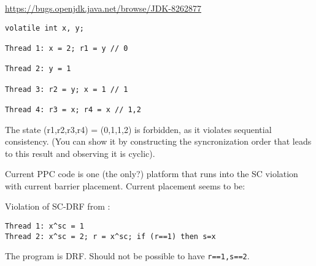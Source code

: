 
\url{https://bugs.openjdk.java.net/browse/JDK-8262877}
\begin{verbatim}
volatile int x, y;

Thread 1: x = 2; r1 = y // 0

Thread 2: y = 1

Thread 3: r2 = y; x = 1 // 1

Thread 4: r3 = x; r4 = x // 1,2
\end{verbatim}
The state (r1,r2,r3,r4) = (0,1,1,2) is forbidden, as it violates sequential
consistency. (You can show it by constructing the syncronization order that
leads to this result and observing it is cyclic).

Current PPC code is one (the only?) platform that runs into the SC violation
with current barrier placement. Current placement seems to be:

Violation of SC-DRF from \cite[Fig.~9]{DBLP:conf/pldi/WattPPBDFPG20}:
\begin{verbatim}
Thread 1: x^sc = 1
Thread 2: x^sc = 2; r = x^sc; if (r==1) then s=x
\end{verbatim}
The program is DRF.
Should not be possible to have \verb|r==1,s==2|.



